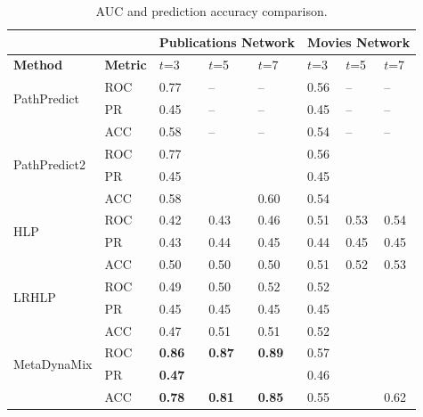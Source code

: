 


\begin{table}[t]
\centering
\caption{AUC and prediction accuracy comparison.}
\label{table_publications}\label{tbl:auc}
\begin{tabular}{ll|p{1cm}|p{1cm}|p{1cm}||p{1cm}|p{1cm}|p{1cm}|}
\cline{3-8}
                        &   & \multicolumn{3}{l||}{Publications Network} & \multicolumn{3}{l|}{Movies Network} \\ \hline
\multicolumn{1}{|l|}{\textbf{Method}} & \textbf{Metric} & $t$=3 & $t$=5  & $t$=7  & $t$=3  & $t$=5  & $t$=7     \\ \hline\hline

\multicolumn{1}{|l|}{\multirow{2}{*}{PathPredict}}  & ROC  & 0.77 & -- & -- & 0.56 & -- & -- \\ \cline{2-8}
\multicolumn{1}{|l|}{}  & PR  & 0.45 & -- & -- & 0.45 & -- & -- \\ \cline{2-8}
\multicolumn{1}{|l|}{}  & ACC  & 0.58 & -- & -- & 0.54  & -- & -- \\ \hline\hline

\multicolumn{1}{|l|}{\multirow{2}{*}{PathPredict2}}  & ROC  &  0.77  &           &           &   0.56   &         &         \\ \cline{2-8}
\multicolumn{1}{|l|}{}  & PR  &   0.45  &           &           &   0.45  &         &         \\ \cline{2-8}
\multicolumn{1}{|l|}{}  & ACC  & 0.58  &    &  0.60 & 0.54  &    &    \\ \hline\hline

\multicolumn{1}{|l|}{\multirow{2}{*}{HLP}}  & ROC  &   0.42  &   0.43   &   0.46     &     0.51    &    0.53     &    0.54     \\ \cline{2-8}
\multicolumn{1}{|l|}{}  & PR  &    0.43  &   0.44   &   0.45    &   0.44   &  0.45   &  0.45  \\ \cline{2-8}
\multicolumn{1}{|l|}{}  & ACC  & 0.50  &  0.50  &  0.50 &  0.51  &  0.52  &  0.53  \\ \hline\hline

\multicolumn{1}{|l|}{\multirow{2}{*}{LRHLP}}  & ROC  &   0.49   &   0.50   &   0.52    &    0.52     &         &         \\ \cline{2-8}
\multicolumn{1}{|l|}{}  & PR  &  0.45    &   0.45   &   0.45   &  0.45   &         &         \\ \cline{2-8}
\multicolumn{1}{|l|}{}  & ACC  & 0.47 & 0.51   & 0.51   & 0.52  &    &    \\ \hline\hline

\multicolumn{1}{|l|}{\multirow{2}{*}{MetaDynaMix}}  & ROC  & \textbf{0.86} &  \textbf{0.87}  & \textbf{0.89}   &  0.57  &   &    \\ \cline{2-8}
\multicolumn{1}{|l|}{}  & PR  & \textbf{0.47} &    &    &  0.46 &    &    \\ \cline{2-8}
\multicolumn{1}{|l|}{}  & ACC  & \textbf{0.78} & \textbf{0.81} & \textbf{0.85}   & 0.55  &    &   0.62 \\ \hline

\end{tabular}
\end{table}


